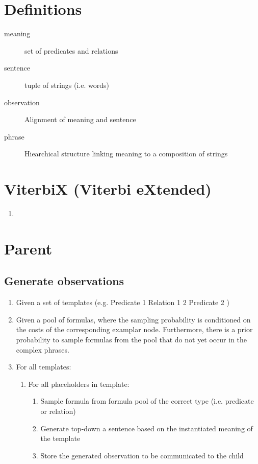\documentclass[a4paper]{article}
\begin{document}
\section{Definitions}
\begin{description}
  \item[meaning] set of predicates and relations
  \item[sentence] tuple of strings (i.e. words)
  \item[observation] Alignment of meaning and sentence
  \item[phrase] Hiearchical structure linking meaning to a composition of strings
\end{description}

\section{ViterbiX (Viterbi eXtended)}
\begin{enumerate}
  \item 
\end{enumerate}

\section{Parent}
\subsection{Generate observations}
\begin{enumerate}
  \item Given a set of templates (e.g. Predicate 1 Relation 1 2 Predicate 2 )
  \item Given a pool of formulas, where the sampling probability is conditioned on the costs of the corresponding examplar node. Furthermore, there is a prior probability to sample formulas from the pool that do not yet occur in the complex phrases.
  \item For all templates:
    \begin{enumerate}
      \item For all placeholders in template:
        \begin{enumerate}
          \item Sample formula from formula pool of the correct type (i.e. predicate or relation)
          \item Generate top-down a sentence based on the instantiated meaning of the template
          \item Store the generated observation to be communicated to the child
        \end{enumerate}
    \end{enumerate}
\end{enumerate}
\end{document}

